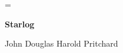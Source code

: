 
\hsize 85mm
\vsize 128mm
\hoffset -16mm
\voffset -18mm

\footline = {}

\bigskip

\bigskip

\centerline{\bf Starlog}

\smallskip

\centerline{John Douglas Harold Pritchard}

\break





\bye

